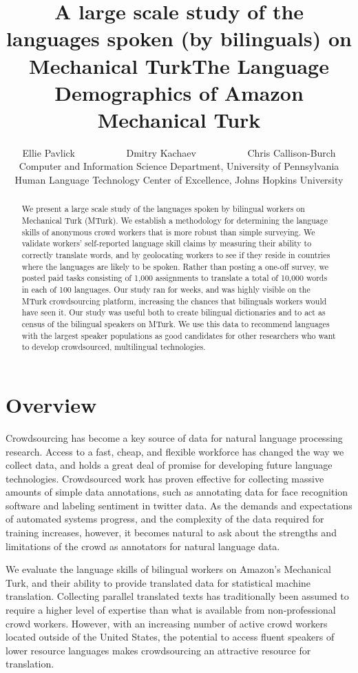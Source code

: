 \documentclass[11pt]{article}
\title{A large scale study of the languages spoken (by bilinguals) on Mechanical Turk}
\title{The Language Demographics of  Amazon Mechanical Turk}
\author{Ellie Pavlick \ \ \ \ \ \ \ \ \ \ Dmitry Kachaev \ \ \ \ \ \ \ \ \ \  Chris Callison-Burch \\
Computer and Information Science Department, University of Pennsylvania \\
Human Language Technology Center of Excellence, Johns Hopkins University \\
  }
\date{}
\begin{document}
\maketitle

\begin{abstract}
We present a large scale study of the languages spoken by bilingual workers on Mechanical Turk (MTurk).  
We establish a  methodology for determining the language skills of anonymous crowd workers that is more robust than simple surveying.  We validate workers' self-reported language skill claims by measuring their ability to correctly translate words, and by geolocating workers to see if they reside in countries where the languages are likely to be spoken. Rather than posting a one-off survey, we posted paid tasks consisting of 1,000 assignments to translate a total of 10,000 words in each of 100 languages.  Our study ran for weeks, and was highly visible on the MTurk crowdsourcing platform, increasing the chances that bilinguals workers would have seen it.  Our study was useful both to create bilingual dictionaries and to act as census of the bilingual speakers on MTurk.  We use this data to recommend languages with the largest speaker populations as good candidates for other researchers who want to  develop crowdsourced, multilingual technologies.

\end{abstract}

\section{Overview}
Crowdsourcing has become a key source of data for natural language processing research. Access to a fast, cheap, and flexible workforce has changed the way we collect data, and holds a great deal of promise for developing future language technologies. Crowdsourced work has proven effective for collecting massive amounts of simple data annotations, such as annotating data for face recognition software and labeling sentiment in twitter data. As the demands and expectations of automated systems progress, and the complexity of the data required for training increases, however, it becomes natural to ask about the strengths and limitations of the crowd as annotators for natural language data.

We evaluate the language skills of bilingual workers on Amazon's Mechanical Turk, and their ability to provide translated data for statistical machine translation. Collecting parallel translated texts has traditionally been assumed to require a higher level of expertise than what is available from non-professional crowd workers. However, with an increasing number of active crowd workers located outside of the United States, the potential to access fluent speakers of lower resource languages makes crowdsourcing an attractive resource for translation.
\end{document}
